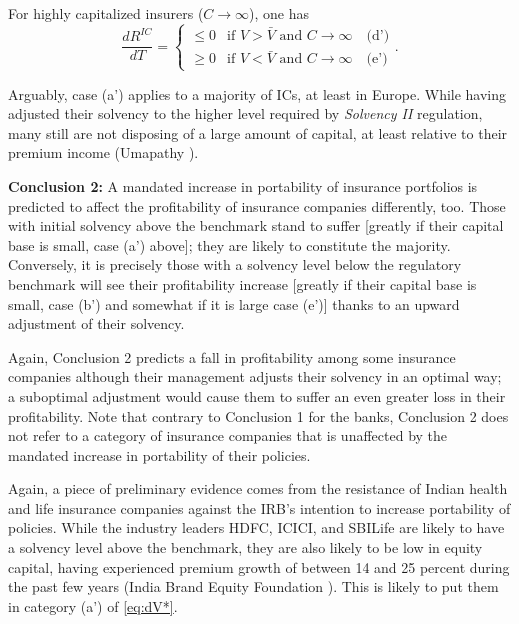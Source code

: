 For highly capitalized insurers ($C \rightarrow \infty$), one has
\begin{equation}
    \frac{dR^{IC}}{dT} =
    \begin{cases} 
        \leq 0 & \text{if } V > \bar{V} \text{ and } C \to \infty \quad \text{(d')} \\ 
        \geq 0 & \text{if } V < \bar{V} \text{ and } C \to \infty \quad \text{(e')}
    \end{cases}.\label{eq:dRIC_cases2}
\end{equation}

Arguably, case (a') applies to a majority of \acp{IC}, at least in Europe. While having adjusted their solvency to the higher level required by \textit{Solvency II} regulation, many still are not disposing of a large amount of capital, at least relative to their premium income (Umapathy \cite{Umapathy2016MatchingFit}).


\textbf{Conclusion 2:} A mandated increase in portability of insurance portfolios is predicted to affect the profitability of insurance companies differently, too. Those with initial solvency above the benchmark stand to suffer [greatly if their capital base is small, case (a') above]; they are likely to constitute the majority.  Conversely, it is precisely those with a solvency level below the regulatory benchmark will see their profitability increase [greatly if their capital base is small, case (b') and somewhat if it is large case (e')] thanks to an upward adjustment of their solvency.

Again, Conclusion 2 predicts a fall in profitability among some insurance companies although their management adjusts their solvency in an optimal way; a suboptimal adjustment would cause them to suffer an even greater loss in their profitability. Note that contrary to Conclusion 1 for the banks, Conclusion 2 does not refer to a category of insurance companies that is unaffected by the mandated increase in portability of their policies.

Again, a piece of preliminary evidence comes from the resistance of Indian health and life insurance companies against the IRB's intention to increase portability of policies. While the industry leaders HDFC, ICICI, and SBILife are likely to have a solvency level above the benchmark, they are also likely to be low in equity capital, having experienced premium growth of between 14 and 25 percent during the past few years (India Brand Equity Foundation \cite{IndiaBrandEquityFoundation2020InsuranceIndia}). This is likely to put them in category (a') of \autoref{eq:dV*}.


